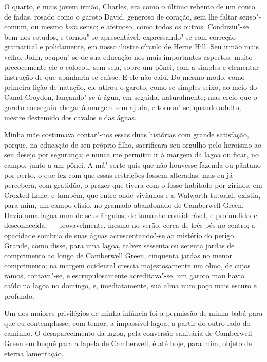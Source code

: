 O quarto, e mais jovem irmão, Charles, era como o último rebento de
um conto de fadas, rosado como o garoto David, generoso de coração, sem
lhe faltar senso"-comum, ou mesmo \textit{bom} senso; e afetuoso, como
todos os outros. Conduziu"-se bem nos estudos, e tornou"-se apresentável,
expressando"-se com correção gramatical e polidamente, em nosso ilustre
círculo de Herne Hill. Seu irmão mais velho, John, ocupou"-se de sua
educação nos mais importantes aspectos: muito precocemente ele o
colocou, sem sela, sobre um pônei, com a simples e elementar instrução
de que apanharia se caísse. E ele não caiu. Do mesmo modo, como primeira
lição de natação, ele atirou o garoto, como se simples seixo, ao meio do
Canal Croydon, lançando"-se à água, em seguida, naturalmente; mas creio
que o garoto conseguiu chegar à margem sem ajuda, e tornou"-se, quando
adulto, mestre destemido dos cavalos e das águas.

Minha mãe costumava contar"-nos essas duas histórias com grande
satisfação, porque, na educação de seu próprio filho, sacrificara seu
orgulho pelo heroísmo ao seu desejo por segurança; e nunca me permitiu
ir à margem da lagoa ou ficar, no campo, junto a um pônei. A má"-sorte
quis que não houvesse fazenda ou pântano por perto, o que fez com que
essas restrições fossem alteradas; mas eu já percebera, com gratidão, o
prazer que tivera com o fosso habitado por girinos, em Croxted Lane; e
também, que entre onde vivíamos e a Walworth tutorial, existia, para
mim, um campo elísio, no gramado abandonado de Camberwell Green.
Havia uma lagoa num de seus ângulos, de tamanho considerável, e
profundidade desconhecida, --- provavelmente, mesmo no verão, cerca de
três pés no centro; a opacidade sombria de suas águas acrescentando"-se
ao mistério do perigo. Grande, como disse, para uma lagoa, talvez
sessenta ou setenta jardas de comprimento ao longo de Camberwell Green,
cinquenta jardas no menor comprimento; na margem ocidental crescia
majestosamente um olmo, de cujos ramos, contava"-se, e escrupulosamente
acreditava"-se, um garoto mau havia caído na lagoa no domingo, e,
imediatamente, sua alma num poço mais escuro e profundo.

Um dos maiores privilégios de minha infância foi a permissão de minha
babá para que eu contemplasse, com temor, a impassível lagoa, a partir
do outro lado do caminho. O desaparecimento da lagoa, pela conversão
sanitária de Camberwell Green em buquê para a lapela de Camberwell, é
até hoje, para mim, objeto de eterna lamentação.

